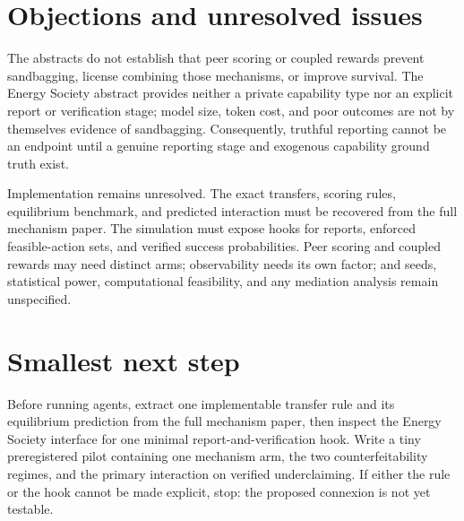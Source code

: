 \documentclass{article}
\begin{document}
\section{Objections and unresolved issues}

The abstracts do not establish that peer scoring or coupled rewards prevent sandbagging, license combining those mechanisms, or improve survival.  The Energy Society abstract provides neither a private capability type nor an explicit report or verification stage; model size, token cost, and poor outcomes are not by themselves evidence of sandbagging.  Consequently, truthful reporting cannot be an endpoint until a genuine reporting stage and exogenous capability ground truth exist. 

Implementation remains unresolved.  The exact transfers, scoring rules, equilibrium benchmark, and predicted interaction must be recovered from the full mechanism paper.  The simulation must expose hooks for reports, enforced feasible-action sets, and verified success probabilities.  Peer scoring and coupled rewards may need distinct arms; observability needs its own factor; and seeds, statistical power, computational feasibility, and any mediation analysis remain unspecified. 

\section{Smallest next step}

Before running agents, extract one implementable transfer rule and its equilibrium prediction from the full mechanism paper, then inspect the Energy Society interface for one minimal report-and-verification hook.  Write a tiny preregistered pilot containing one mechanism arm, the two counterfeitability regimes, and the primary interaction on verified underclaiming.  If either the rule or the hook cannot be made explicit, stop: the proposed connexion is not yet testable. 
\end{document}
